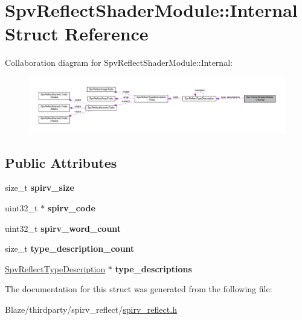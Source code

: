 \hypertarget{structSpvReflectShaderModule_1_1Internal}{}\section{Spv\+Reflect\+Shader\+Module\+:\+:Internal Struct Reference}
\label{structSpvReflectShaderModule_1_1Internal}


Collaboration diagram for Spv\+Reflect\+Shader\+Module\+:\+:Internal\+:\nopagebreak
\begin{figure}[H]
\begin{center}
\leavevmode
\includegraphics[width=350pt]{structSpvReflectShaderModule_1_1Internal__coll__graph}
\end{center}
\end{figure}
\subsection*{Public Attributes}
\begin{DoxyCompactItemize}
\item 
\mbox{\label{structSpvReflectShaderModule_1_1Internal_a8558f0dc13dd1778d91a14d697c98e09}} 
size\+\_\+t {\bfseries spirv\+\_\+size}
\item 
\mbox{\label{structSpvReflectShaderModule_1_1Internal_a1e4db7b5cb8b5fe489ce48fe2241169e}} 
uint32\+\_\+t $\ast$ {\bfseries spirv\+\_\+code}
\item 
\mbox{\label{structSpvReflectShaderModule_1_1Internal_aa3b15874b2410eeebe2d0ab5fd75e472}} 
uint32\+\_\+t {\bfseries spirv\+\_\+word\+\_\+count}
\item 
\mbox{\label{structSpvReflectShaderModule_1_1Internal_ae5304eadc9d6a3925f4d3670f94c4358}} 
size\+\_\+t {\bfseries type\+\_\+description\+\_\+count}
\item 
\mbox{\label{structSpvReflectShaderModule_1_1Internal_a1980984c95f39a80b49ed6aa4048eb73}} 
\hyperlink{structSpvReflectTypeDescription}{Spv\+Reflect\+Type\+Description} $\ast$ {\bfseries type\+\_\+descriptions}
\end{DoxyCompactItemize}


The documentation for this struct was generated from the following file\+:\begin{DoxyCompactItemize}
\item 
Blaze/thirdparty/spirv\+\_\+reflect/\hyperlink{spirv__reflect_8h}{spirv\+\_\+reflect.\+h}\end{DoxyCompactItemize}
